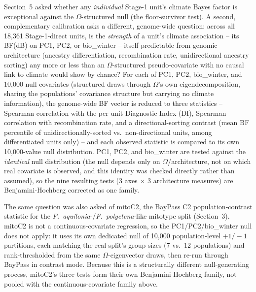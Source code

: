 \documentclass[11pt]{article}
\newcommand{\Faq}{\textit{F.~aquilonia}}
\newcommand{\Fpo}{\textit{F.~polyctena}}
\begin{document}
Section~5 asked whether any \emph{individual} Stage-1 unit's climate Bayes factor is
exceptional against the $\Omega$-structured null (the floor-survivor test). A second,
complementary calibration asks a different, genome-wide question: across all 18{,}361
Stage-1-direct units, is the \emph{strength} of a unit's climate association --
its BF(dB) on PC1, PC2, or bio\_winter -- itself predictable from genomic architecture
(ancestry differentiation, recombination rate, unidirectional ancestry sorting) any more or
less than an $\Omega$-structured pseudo-covariate with no causal link to climate would show
by chance? For each of PC1, PC2, bio\_winter, and 10{,}000 null covariates (structured draws
through $\Omega$'s own eigendecomposition, sharing the populations' covariance structure but
carrying no climate information), the genome-wide BF vector is reduced to three statistics --
Spearman correlation with the per-unit Diagnostic Index (DI), Spearman correlation with
recombination rate, and a directional-sorting contrast (mean BF percentile of
unidirectionally-sorted vs.\ non-directional units, among differentiated units only) -- and
each observed statistic is compared to its own 10{,}000-value null distribution. PC1, PC2,
and bio\_winter are tested against the \emph{identical} null distribution (the null depends
only on $\Omega$/architecture, not on which real covariate is observed, and this identity was
checked directly rather than assumed), so the nine resulting tests (3 axes $\times$ 3
architecture measures) are Benjamini-Hochberg corrected as one family.

The same question was also asked of mitoC2, the BayPass C2 population-contrast statistic for
the \Faq{}-/\Fpo{}-like mitotype split (Section~3). mitoC2 is not a continuous-covariate
regression, so the PC1/PC2/bio\_winter null does not apply: it uses its own dedicated null of
10{,}000 population-level $+1/-1$ partitions, each matching the real split's group sizes
(7 vs.\ 12 populations) and rank-thresholded from the same $\Omega$-eigenvector draws, then
re-run through BayPass in contrast mode. Because this is a structurally different
null-generating process, mitoC2's three tests form their own Benjamini-Hochberg family, not
pooled with the continuous-covariate family above.
\end{document}
